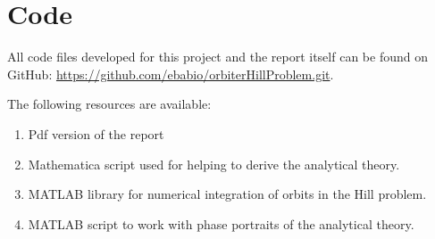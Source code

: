 \section{Code} \label{annexCode}

All code files developed for this project and the report itself can be found on GitHub: \url{https://github.com/ebabio/orbiterHillProblem.git}.

The following resources are available:
\begin{enumerate}
	\item Pdf version of the report
	
	\item Mathematica script used for helping to derive the analytical theory.
	
	\item MATLAB library for numerical integration of orbits in the Hill problem.
	
	\item MATLAB script to work with phase portraits of the analytical theory.
	
\end{enumerate}
